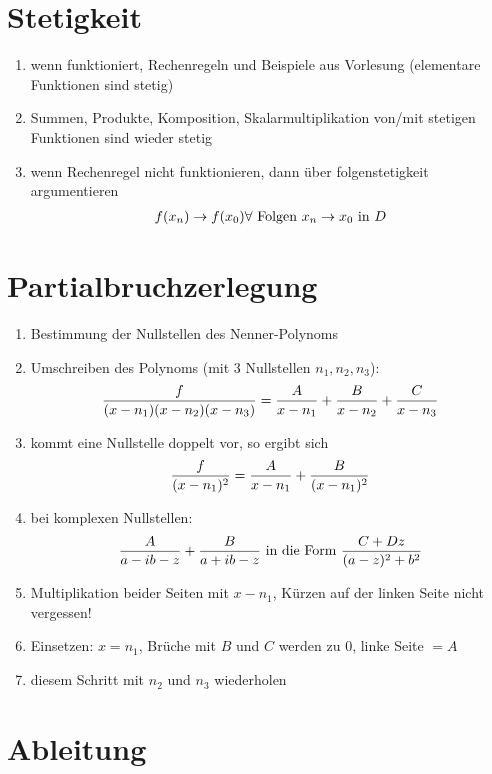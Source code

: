 \documentclass[ngerman,a4paper]{article}
\begin{document}
\section{Stetigkeit}
\begin{enumerate}
	\item wenn funktioniert, Rechenregeln und Beispiele aus Vorlesung (elementare Funktionen sind stetig)
	\item Summen, Produkte, Komposition, Skalarmultiplikation von/mit stetigen Funktionen sind wieder stetig
	\item wenn Rechenregel nicht funktionieren, dann über folgenstetigkeit argumentieren
	\begin{align}
		f(x_n) \to f(x_0) \forall \text{ Folgen } x_n \to x_0 \text{ in } D\notag
	\end{align}
\end{enumerate}

\section{Partialbruchzerlegung}
\begin{enumerate}[label=\textbf{\arabic*.}]
	\item Bestimmung der Nullstellen des Nenner-Polynoms
	\item Umschreiben des Polynoms (mit 3 Nullstellen $n_1,n_2,n_3$):
	\begin{align}
		\frac{f}{(x-n_1)(x-n_2)(x-n_3)}=\frac{A}{x-n_1}+\frac{B}{x-n_2}+\frac{C}{x-n_3}\notag
	\end{align}
	\item kommt eine Nullstelle doppelt vor, so ergibt sich
	\begin{align}
		\frac{f}{(x-n_1)^2}=\frac{A}{x-n_1}+\frac{B}{(x-n_1)^2}\notag
	\end{align}
	\item bei komplexen Nullstellen:
	\begin{align}
		\frac{A}{a-ib-z}+\frac{B}{a+ib-z} \text{ in die Form } \frac{C+Dz}{(a-z)^2+b^2}\notag
	\end{align}
	\item Multiplikation beider Seiten mit $x-n_1$, Kürzen auf der linken Seite nicht vergessen!
	\item Einsetzen: $x=n_1$, Brüche mit $B$ und $C$ werden zu 0, linke Seite $= A$
	\item diesem Schritt mit $n_2$ und $n_3$ wiederholen
\end{enumerate}

\section{Ableitung}
\end{document}
